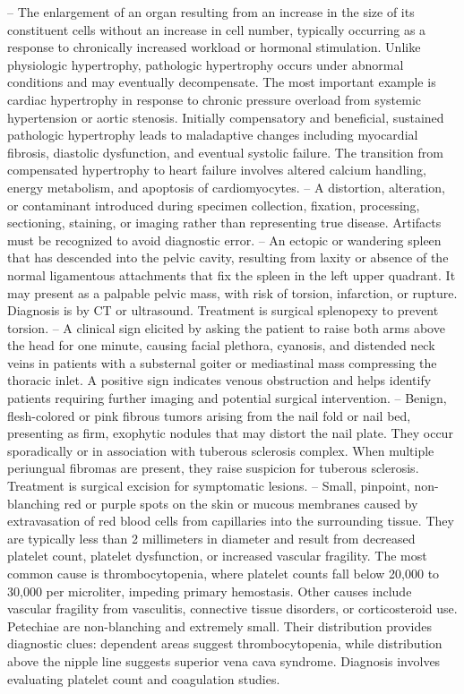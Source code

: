 -- The enlargement of an organ resulting from an increase in the size of its constituent cells without an increase in cell number, typically occurring as a response to chronically increased workload or hormonal stimulation. Unlike physiologic hypertrophy, pathologic hypertrophy occurs under abnormal conditions and may eventually decompensate. The most important example is cardiac hypertrophy in response to chronic pressure overload from systemic hypertension or aortic stenosis. Initially compensatory and beneficial, sustained pathologic hypertrophy leads to maladaptive changes including myocardial fibrosis, diastolic dysfunction, and eventual systolic failure. The transition from compensated hypertrophy to heart failure involves altered calcium handling, energy metabolism, and apoptosis of cardiomyocytes.
-- A distortion, alteration, or contaminant introduced during specimen collection, fixation, processing, sectioning, staining, or imaging rather than representing true disease. Artifacts must be recognized to avoid diagnostic error.
-- An ectopic or wandering spleen that has descended into the pelvic cavity, resulting from laxity or absence of the normal ligamentous attachments that fix the spleen in the left upper quadrant. It may present as a palpable pelvic mass, with risk of torsion, infarction, or rupture. Diagnosis is by CT or ultrasound. Treatment is surgical splenopexy to prevent torsion.
-- A clinical sign elicited by asking the patient to raise both arms above the head for one minute, causing facial plethora, cyanosis, and distended neck veins in patients with a substernal goiter or mediastinal mass compressing the thoracic inlet. A positive sign indicates venous obstruction and helps identify patients requiring further imaging and potential surgical intervention.
-- Benign, flesh-colored or pink fibrous tumors arising from the nail fold or nail bed, presenting as firm, exophytic nodules that may distort the nail plate. They occur sporadically or in association with tuberous sclerosis complex. When multiple periungual fibromas are present, they raise suspicion for tuberous sclerosis. Treatment is surgical excision for symptomatic lesions.
-- Small, pinpoint, non-blanching red or purple spots on the skin or mucous membranes caused by extravasation of red blood cells from capillaries into the surrounding tissue. They are typically less than 2 millimeters in diameter and result from decreased platelet count, platelet dysfunction, or increased vascular fragility. The most common cause is thrombocytopenia, where platelet counts fall below 20,000 to 30,000 per microliter, impeding primary hemostasis. Other causes include vascular fragility from vasculitis, connective tissue disorders, or corticosteroid use. Petechiae are non-blanching and extremely small. Their distribution provides diagnostic clues: dependent areas suggest thrombocytopenia, while distribution above the nipple line suggests superior vena cava syndrome. Diagnosis involves evaluating platelet count and coagulation studies.
